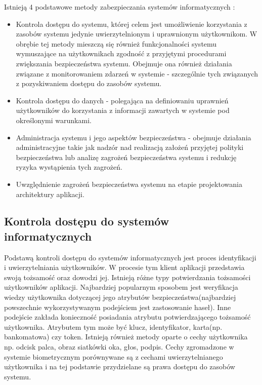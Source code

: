 Istnieją 4 podstawowe metody zabezpieczania systemów informatycznych \cite{Russell91}:

\begin{itemize}
	\item Kontrola dostępu do systemu, której celem jest umożliwienie korzystania z zasobów systemu jedynie uwierzytelnionym i uprawnionym użytkownikom. W obrębie tej metody mieszczą się również funkcjonalności systemu wymuszające na użytkownikach zgodność z przyjętymi procedurami zwiększania bezpieczeństwa systemu. Obejmuje ona również działania związane z monitorowaniem zdarzeń w systemie - szczególnie tych związanych z pozyskiwaniem dostępu do zasobów systemu. 
	\item Kontrola dostępu do danych - polegająca na definiowaniu uprawnień użytkowników do korzystania z informacji zawartych w systemie pod określonymi warunkami.
	\item Administracja systemu i jego aspektów bezpieczeństwa - obejmuje działania administracyjne takie jak nadzór nad realizacją założeń przyjętej polityki bezpieczeństwa lub analizę zagrożeń bezpieczeństwa systemu i redukcję ryzyka wystąpienia tych zagrożeń. 
	\item Uwzględnienie zagrożeń bezpieczeństwa systemu na etapie projektowania architektury aplikacji. 
\end{itemize} 
		
\subsection{Kontrola dostępu do systemów informatycznych}

	Podstawą kontroli dostępu do systemów informatycznych jest proces identyfikacji i uwierzytelniania użytkowników. W procesie tym klient aplikacji przedstawia swoją tożsamość oraz dowodzi jej. Istnieją różne typy potwierdzania tożsamości użytkowników aplikacji. Najbardziej popularnym sposobem jest weryfikacja wiedzy użytkownika dotyczącej jego atrybutów bezpieczeństwa(najbardziej powszechnie wykorzystywanym podejściem jest zastosowanie haseł). Inne podejście zakłada konieczność posiadania atrybutu potwierdzającego tożsamość użytkownika. Atrybutem tym może być klucz, identyfikator, karta(np. bankomatowa) czy token. Istnieją również metody oparte o cechy użytkownika np. odcisk palca, obraz siatkówki oka, głos, podpis. Cechy zgromadzone w systemie biometrycznym porównywane są z cechami uwierzytelnianego użytkownika i na tej podstawie przydzielane są prawa dostępu do zasobów systemu.

